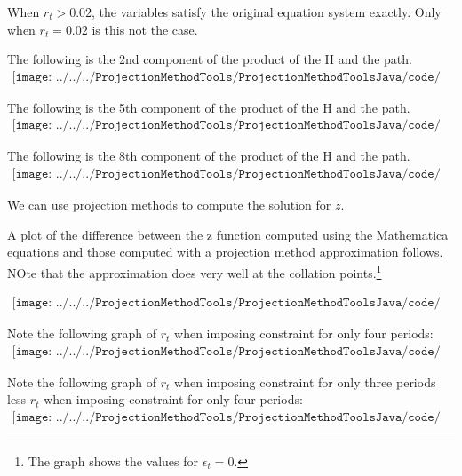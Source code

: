 \documentclass[12pt]{article}
\begin{document}
When $r_t>0.02$, the variables satisfy the original equation system exactly.
Only when $r_t=0.02$ is this not the case.


The following is the 2nd component of the product of the H and the path.
\begin{gather*}
\texttt{[image: ../../../ProjectionMethodTools/ProjectionMethodToolsJava/code/prettyhapp03A.pdf]}
\end{gather*}

The following is the 5th component of the product of the H and the path.
\begin{gather*}
\texttt{[image: ../../../ProjectionMethodTools/ProjectionMethodToolsJava/code/prettyhapp03B.pdf]}
\end{gather*}

The following is the 8th component of the product of the H and the path.
\begin{gather*}
\texttt{[image: ../../../ProjectionMethodTools/ProjectionMethodToolsJava/code/prettyhapp03C.pdf]}
\end{gather*}



We can use projection methods to compute the solution for $z$.

A plot of the difference between the z function computed using the Mathematica equations and those computed with a projection method approximation follows. NOte that the approximation does very well at the collation points.\footnote{The graph shows the values for $\epsilon_t=0$.}


\begin{gather*}
\texttt{[image: ../../../ProjectionMethodTools/ProjectionMethodToolsJava/code/prettyNumDiff03.pdf]}
\end{gather*}




Note the following graph of $r_t$ when imposing constraint for only four
 periods:
\begin{gather*}
\texttt{[image: ../../../ProjectionMethodTools/ProjectionMethodToolsJava/code/prettyrr04.pdf]}
\end{gather*}



Note the following graph of $r_t$ when imposing constraint for only three periods
less $r_t$ when imposing constraint for only four periods:
\begin{gather*}
\texttt{[image: ../../../ProjectionMethodTools/ProjectionMethodToolsJava/code/prettyrr03lessrr04.pdf]}
\end{gather*}
\end{document}
